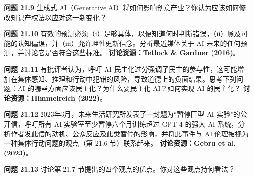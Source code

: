\textbf{问题 21.9} 生成式 AI（Generative AI）将如何影响创意产业？你认为应该如何修改知识产权法以应对这一新变化？

\textbf{问题 21.10} 有效的预测必须（i）足够具体，以便知道何时判断错误，（ii）顾及可能的认知偏误，并（iii）允许理性更新信念。分析最近媒体关于 AI 未来的任何预测，并讨论它是否符合这些标准。
\textbf{讨论资源：Tetlock \& Gardner (2016)}。

\textbf{问题 21.11} 有批评者认为，呼吁 AI 民主化过分强调了民主的参与性，这可能增加在集体感知、推理和行动中犯错的风险，导致道德上的负面结果。思考下列问题：AI 的哪些方面应该民主化？为什么要民主化 AI？如何实现 AI 的民主化？
\textbf{讨论资源：Himmelreich (2022)}。

\textbf{问题 21.12} 2023年3月，未来生活研究所发表了一封题为“暂停巨型 AI 实验”的公开信，呼吁所有 AI 实验室至少暂停六个月训练超过 GPT-4 的强大 AI 系统。分析作者发此信的动机、公众反应及此类暂停的影响，并将此事件与 AI 伦理被视为一种集体行动问题的观点（第 21.6 节）联系起来。
\textbf{讨论资源：Gebru et al. (2023)}。

\textbf{问题 21.13} 讨论第 21.7 节提出的四个观点的优点。你对这些观点持何看法？









